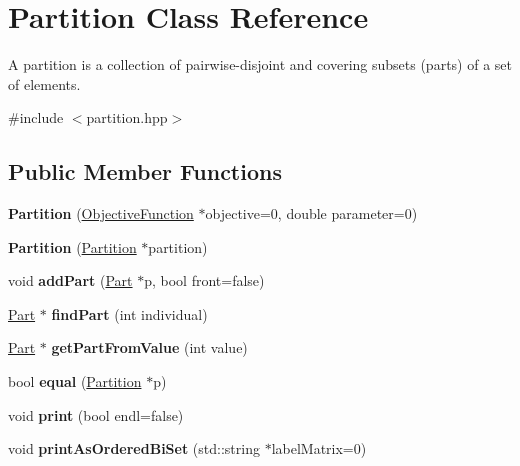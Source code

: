 \hypertarget{classPartition}{\section{Partition Class Reference}
\label{classPartition}
}


A partition is a collection of pairwise-\/disjoint and covering subsets (parts) of a set of elements.  




{\ttfamily \#include $<$partition.\-hpp$>$}

\subsection*{Public Member Functions}
\begin{DoxyCompactItemize}
\item 
\hypertarget{classPartition_ab2274b9cf773fea65da75facdf88ae98}{{\bfseries Partition} (\hyperlink{classObjectiveFunction}{Objective\-Function} $\ast$objective=0, double parameter=0)}\label{classPartition_ab2274b9cf773fea65da75facdf88ae98}

\item 
\hypertarget{classPartition_acb291b3b0ccf48005e141be32fdd7efd}{{\bfseries Partition} (\hyperlink{classPartition}{Partition} $\ast$partition)}\label{classPartition_acb291b3b0ccf48005e141be32fdd7efd}

\item 
\hypertarget{classPartition_a63f82a3a75dc0c3d0d27766b2459c9fe}{void {\bfseries add\-Part} (\hyperlink{classPart}{Part} $\ast$p, bool front=false)}\label{classPartition_a63f82a3a75dc0c3d0d27766b2459c9fe}

\item 
\hypertarget{classPartition_ae21fdef95c1f37a6a677ac145f29b119}{\hyperlink{classPart}{Part} $\ast$ {\bfseries find\-Part} (int individual)}\label{classPartition_ae21fdef95c1f37a6a677ac145f29b119}

\item 
\hypertarget{classPartition_a76ac69e01cafef5af0fef2e917e6fdf1}{\hyperlink{classPart}{Part} $\ast$ {\bfseries get\-Part\-From\-Value} (int value)}\label{classPartition_a76ac69e01cafef5af0fef2e917e6fdf1}

\item 
\hypertarget{classPartition_abced08b339e293866a614b2f21414375}{bool {\bfseries equal} (\hyperlink{classPartition}{Partition} $\ast$p)}\label{classPartition_abced08b339e293866a614b2f21414375}

\item 
\hypertarget{classPartition_a3463b34ab90d020ed40635c473301a64}{void {\bfseries print} (bool endl=false)}\label{classPartition_a3463b34ab90d020ed40635c473301a64}

\item 
\hypertarget{classPartition_aa62d7a32af5dccfb34a44d023d1f08f9}{void {\bfseries print\-As\-Ordered\-Bi\-Set} (std\-::string $\ast$label\-Matrix=0)}\label{classPartition_aa62d7a32af5dccfb34a44d023d1f08f9}

\end{DoxyCompactItemize}

